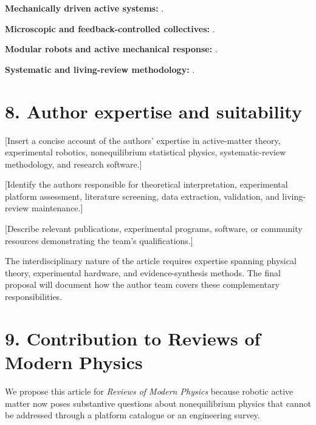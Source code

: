 \noindent\textbf{Mechanically driven active systems:}
\cite{Welch2018aggregatesuppressio,Deblais2019howtoforceanarmy,Chvykov2020lowrattlingapred,Barone2024experimentalandnum,Wang2025hyperuniformnetwork}.

\noindent\textbf{Microscopic and feedback-controlled collectives:}
\cite{Xie2020bioinspiredsoftmic,Pauer2021programmabledesign,Sun2021swarmingmicrodrople,Buerle2020formationofstable,Heuthe2025tunablecolloidalsw}.

\noindent\textbf{Modular robots and active mechanical response:}
\cite{Li2019particleroboticsba,Savoie2019arobotmadeofrobo,Brandenbourger2021limitcyclesturnac,Coulais2025activemetamaterials,Binysh2026moreislessinunpe}.

\noindent\textbf{Systematic and living-review methodology:}
\cite{Page2021prisma,McGowan2016press,Elliott2014living,Elliott2017living,Matl2017vascular,Litjens2017survey}.

\section*{8. Author expertise and suitability}

[Insert a concise account of the authors'
expertise in active-matter theory,
experimental robotics, nonequilibrium
statistical physics, systematic-review
methodology, and research software.]

[Identify the authors responsible for
theoretical interpretation, experimental
platform assessment, literature screening,
data extraction, validation, and
living-review maintenance.]

[Describe relevant publications,
experimental programs, software,
or community resources demonstrating
the team's qualifications.]

The interdisciplinary nature of the
article requires expertise spanning
physical theory, experimental hardware,
and evidence-synthesis methods.
The final proposal will document
how the author team covers
these complementary responsibilities.

\section*{9. Contribution to Reviews of Modern Physics}

We propose this article for
\textit{Reviews of Modern Physics}
because robotic active matter now
poses substantive questions about
nonequilibrium physics that cannot
be addressed through a platform
catalogue or an engineering survey.

